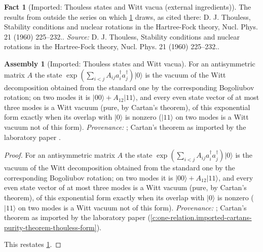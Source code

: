 \documentclass[11pt]{article}
\theoremstyle{definition}
\newtheorem{fact}[theorem]{Fact}
\newtheorem{assembled}[theorem]{Assembly}
\theoremstyle{plain}
\providecommand{\ket}{}\renewcommand{\ket}[1]{|#1\rangle}
\begin{document}
\begin{fact}[Imported: Thouless states and Witt vacua (external ingredients)]\label{c:descent-lift.imported-thouless-states-witt-vacua-external}
The results from outside the series on which \ref{c:descent-lift.imported-thouless-states-witt-vacua} draws, as cited there: D. J. Thouless, Stability conditions and nuclear rotations in the Hartree-Fock theory, Nucl. Phys. 21 (1960) 225--232..
\emph{Source:} D. J. Thouless, Stability conditions and nuclear rotations in the Hartree-Fock theory, Nucl. Phys. 21 (1960) 225--232..
\end{fact}

\begin{assembled}[Imported: Thouless states and Witt vacua]\label{c:descent-lift.imported-thouless-states-witt-vacua}
For an antisymmetric matrix $A$ the state $\exp(\sum_{i<j}A_{ij}a^{\dagger}_{i}a^{\dagger}_{j})\ket{0}$ is the vacuum of the Witt decomposition obtained from the standard one by the corresponding Bogoliubov rotation; on two modes it is $\ket{00} + A_{12}\ket{11}$, and every even state vector of at most three modes is a Witt vacuum (pure, by Cartan's theorem), of this exponential form exactly when its overlap with $\ket{0}$ is nonzero ($\ket{11}$ on two modes is a Witt vacuum not of this form). \emph{Provenance:} \cite{Thouless1960}; Cartan's theorem as imported by the laboratory paper \cite[Fact~2.10]{ButlerT16}.
\end{assembled}
\begin{proof}
For an antisymmetric matrix $A$ the state $\exp(\sum_{i<j}A_{ij}a^{\dagger}_{i}a^{\dagger}_{j})\ket{0}$ is the vacuum of the Witt decomposition obtained from the standard one by the corresponding Bogoliubov rotation; on two modes it is $\ket{00} + A_{12}\ket{11}$, and every even state vector of at most three modes is a Witt vacuum (pure, by Cartan's theorem), of this exponential form exactly when its overlap with $\ket{0}$ is nonzero ($\ket{11}$ on two modes is a Witt vacuum not of this form). \emph{Provenance:} \cite{Thouless1960}; Cartan's theorem as imported by the laboratory paper \cite[Fact~2.10]{ButlerT16} (\ref{c:one-relation.imported-cartans-purity-theorem-thouless-form}).

This restates \ref{c:descent-lift.imported-thouless-states-witt-vacua-external}.

\end{proof}
\end{document}
